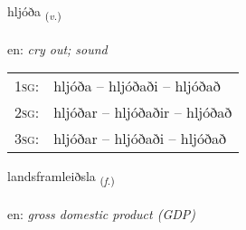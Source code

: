 \documentclass[frontgrid, backgrid]{flacards}\usepackage[]{graphicx}\usepackage[]{xcolor}
\begin{document}
\renewcommand{\flhead}{\vskip5pt \fboxsep=0pt {\small\bfseries\footnotesize Sagnorð | Verb}}
\renewcommand{\fcfoot}{\vskip5pt \fboxsep=0pt \hspace{2pt}{\small\bfseries\footnotesize 3K}}

\renewcommand{\blhead}{\vskip5pt {\small\bfseries\footnotesize Sagnorð | Verb }}
\renewcommand{\bcfoot}{\vskip5pt \hspace{2pt}{\small\bfseries\footnotesize 3K}}


{hljóða \small{\textsubscript{(\textit{v.})}} \\[1ex] %
\textphonetic{[l̥jouːða]} \\
en: \emph{cry out; sound} \\  [2ex]
\renewcommand*{\arraystretch}{0.8}
\begin{tabular}{p{1cm}l}
\textsc{1sg}: & hljóða -- hljóðaði -- hljóðað \\ 
\textsc{2sg}: & hljóðar -- hljóðaðir -- hljóðað \\ 
\textsc{3sg}: & hljóðar -- hljóðaði -- hljóðað \\ 
\end{tabular}
}

\renewcommand{\flhead}{\vskip5pt \fboxsep=0pt {\small\bfseries\footnotesize Nafnorð | Noun}}
\renewcommand{\fcfoot}{\vskip5pt \fboxsep=0pt \hspace{2pt}{\small\bfseries\footnotesize 3K}}

\renewcommand{\blhead}{\vskip5pt {\small\bfseries\footnotesize Nafnorð | Noun }}
\renewcommand{\bcfoot}{\vskip5pt \hspace{2pt}{\small\bfseries\footnotesize 3K}}


{landsframleiðsla \small{\textsubscript{(\textit{f.})}} \\[1ex] %
\textphonetic{[lantsframleiðstla]} \\
en: \emph{gross domestic product (GDP)} \\  [2ex]
\renewcommand*{\arraystretch}{0.8}
}
\end{document}
